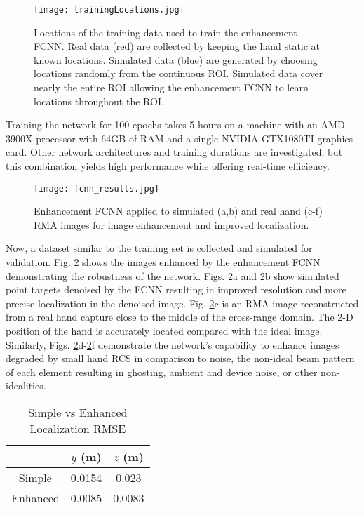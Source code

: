 \documentclass[10pt,journal,final]{IEEEtran}
\begin{document}
\begin{figure}[h]
	\centering
	\texttt{[image: trainingLocations.jpg]}
	\caption{Locations of the training data used to train the enhancement FCNN. Real data (red) are collected by keeping the hand static at known locations. Simulated data (blue) are generated by choosing locations randomly from the continuous ROI. Simulated data cover nearly the entire ROI allowing the enhancement FCNN to learn locations throughout the ROI.}
	\label{fig:fcnn_training_locations}
\end{figure}

Training the network for 100 epochs takes 5 hours on a machine with an AMD 3900X processor with 64GB of RAM and a single NVIDIA GTX1080TI graphics card. Other network architectures and training durations are investigated, but this combination yields high performance while offering real-time efficiency.

\begin{figure}[h]
	\centering
	\texttt{[image: fcnn\_results.jpg]}
	\caption{Enhancement FCNN applied to simulated (a,b) and real hand (c-f) RMA images for image enhancement and improved localization.}
	\label{fig:fcnn_enhancement_demo}
\end{figure}

Now, a dataset similar to the training set is collected and simulated for validation. Fig. \ref{fig:fcnn_enhancement_demo} shows the images enhanced by the enhancement FCNN demonstrating the robustness of the network. Figs. \ref{fig:fcnn_enhancement_demo}a and \ref{fig:fcnn_enhancement_demo}b show simulated point targets denoised by the FCNN resulting in improved resolution and more precise localization in the denoised image. Fig. \ref{fig:fcnn_enhancement_demo}c is an RMA image reconstructed from a real hand capture close to the middle of the cross-range domain. The 2-D position of the hand is accurately located compared with the ideal image. Similarly, Figs. \ref{fig:fcnn_enhancement_demo}d-\ref{fig:fcnn_enhancement_demo}f demonstrate the network's capability to enhance images degraded by small hand RCS in comparison to noise, the non-ideal beam pattern of each element resulting in ghosting, ambient and device noise, or other non-idealities.

\begin{table} [h]
	\caption{Simple vs Enhanced Localization RMSE}
	\centering
	\begin{tabular}{c || c c}
		\hline
		& $y$ (m) & $z$ (m) \\
		\hline\hline
		Simple & 0.0154 & 0.023 \\ 
		\hline
		Enhanced & 0.0085 & 0.0083 \\ 
		\hline
	\end{tabular}
\label{table:fcnn_position_rmse}
\end{table}
\end{document}
